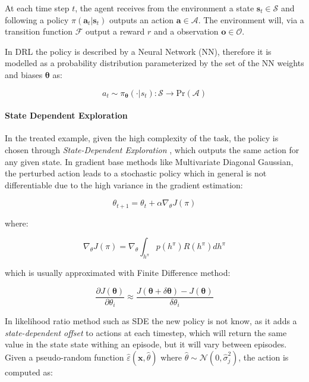 At each time step $t$, the agent receives from the environment a state $\mathbf{s}_t \in \mathcal{S}$ and following a policy $\pi (\mathbf{a}_t | \mathbf{s}_t)$ outputs an action $\mathbf{a} \in \mathcal{A}$. The environment will, via a transition function $\mathcal{F}$ output a reward $r$ and a observation $\mathbf{o} \in \mathcal{O}$.

In \ac{DRL} the policy is described by a Neural Network (\ac{NN}), therefore it is modelled as a probability distribution parameterized by the set of the \ac{NN} weights and biases $\boldsymbol{\theta}$ as:

\begin{equation}
    a _t \sim \pi _{\boldsymbol{\theta}}(\cdot | s_t): \mathcal{S} \rightarrow \mathrm{Pr}(\mathcal{A})
\end{equation}

\paragraph{State Dependent Exploration} In the treated example, given the high complexity of the task, the policy is chosen through \textit{State-Dependent Exploration} \citep{daelemans_state-dependent_2008, raffin_smooth_2021}, which outputs the same action for any given state. In gradient base methods like Multivariate Diagonal Gaussian, the perturbed action leads to a stochastic policy which in general is not differentiable due to the high variance in the gradient estimation:

\begin{equation}
    \theta _{t+1} = \theta _t + \alpha \nabla _{\theta} J(\pi)
\end{equation}

where:

\begin{equation}
    \nabla _{\theta} J(\pi) = \nabla _{\theta} \int _{h ^{\pi}} p(h ^{\pi})R(h ^{\pi})dh ^{\pi}
\end{equation}

which is usually approximated with Finite Difference method:

\begin{equation}
    \label{eqn:finitediff}
    \frac{\partial J(\boldsymbol{\theta})}{\partial \theta _i} \approx \frac{J(\boldsymbol{\theta} + \delta \boldsymbol{\theta}) - J(\boldsymbol{\theta})}{\delta \theta _i}
\end{equation}

In likelihood ratio method such as \ac{SDE} the new policy is not know, as it adds a \textit{state-dependent offset} to actions at each timestep, which will return the same value in the state state withing an episode, but it will vary between episodes. Given a pseudo-random function $\hat{\varepsilon}(\mathbf{x}, \hat{\theta})$ where $\hat{\theta} \sim \mathcal{N}(0, \hat{\sigma} _j ^2)$, the action is computed as:

